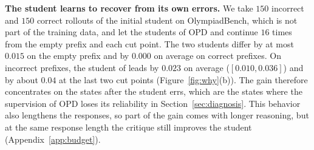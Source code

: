 \noindent\textbf{The student learns to recover from its own errors.}
We take $150$ incorrect and $150$ correct rollouts of the initial student on OlympiadBench, which is not part of the training data, and let the students of OPD and \ours{} continue $16$ times from the empty prefix and each cut point.
The two students differ by at most $0.015$ on the empty prefix and by $0.000$ on average on correct prefixes.
On incorrect prefixes, the student of \ours{} leads by $0.023$ on average ($[0.010, 0.036]$) and by about $0.04$ at the last two cut points (Figure~\ref{fig:why}(b)).
The gain therefore concentrates on the states after the student errs, which are the states where the supervision of OPD loses its reliability in Section~\ref{sec:diagnosis}.
This behavior also lengthens the responses, so part of the gain comes with longer reasoning, but at the same response length the critique still improves the student (Appendix~\ref{app:budget}).